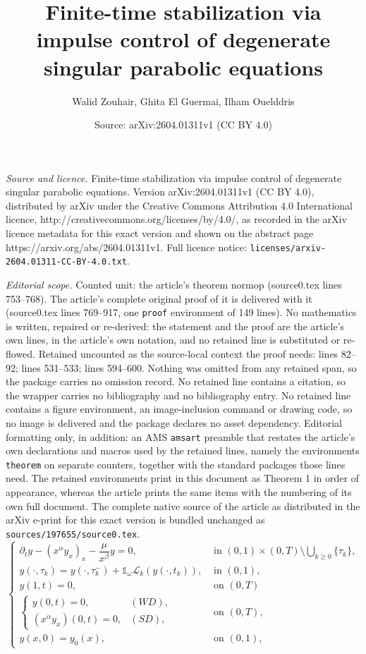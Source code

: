 \documentclass[10pt,a4paper]{amsart}
\title{Finite-time stabilization via impulse control of degenerate singular parabolic equations}
\author{Walid Zouhair, Ghita El Guermai, Ilham Ouelddris}
\date{Source: arXiv:2604.01311v1 (CC BY 4.0)}
\begin{document}
\maketitle

\noindent\emph{Source and licence.} Finite-time stabilization via impulse control of degenerate singular parabolic equations. Version arXiv:2604.01311v1 (CC BY 4.0), distributed by arXiv under the Creative Commons Attribution 4.0 International licence, http://creativecommons.org/licenses/by/4.0/, as recorded in the arXiv licence metadata for this exact version and shown on the abstract page https://arxiv.org/abs/2604.01311v1. Full licence notice: \texttt{licenses/arxiv-2604.01311-CC-BY-4.0.txt}.\par\smallskip

\noindent\textit{Editorial scope.} Counted unit: the article's theorem normop (source0.tex lines 753--768). The article's complete original proof of it is delivered with it (source0.tex lines 769--917, one \texttt{proof} environment of 149 lines). No mathematics is written, repaired or re-derived: the statement and the proof are the article's own lines, in the article's own notation, and no retained line is substituted or re-flowed.  Retained uncounted as the source-local context the proof needs: lines 82--92; lines 531--533; lines 594--600.  Nothing was omitted from any retained span, so the package carries no omission record.  No retained line contains a citation, so the wrapper carries no bibliography and no bibliography entry.  No retained line contains a figure environment, an image-inclusion command or drawing code, so no image is delivered and the package declares no asset dependency.  Editorial formatting only, in addition: an AMS \texttt{amsart} preamble that restates the article's own declarations and macros used by the retained lines, namely the environments \texttt{theorem} on separate counters, together with the standard packages those lines need.  The retained environments print in this document as Theorem 1 in order of appearance, whereas the article prints the same items with the numbering of its own full document.  The complete native source of the article as distributed in the arXiv e-print for this exact version is bundled unchanged as \texttt{sources/197655/source0.tex}.
\begin{equation}\label{1.1}
\begin{cases}\partial_t y-\left(x^\alpha y_x\right)_x-\dfrac{\mu}{x^\beta} y=0, & \text { in }(0,1) \times(0, T) \setminus\displaystyle \bigcup_{k\geq 0 }\{\tau_{k}\}, \\ 
y(\cdot, \tau_{k})=y\left(\cdot, \tau_{k}^{-}\right)+\mathds{1}_{\omega} \mathcal{L}_{k}(y(\cdot,t_{k})), &\text { in } (0,1),\\
y(1, t)=0,  & \text { on }(0, T)\\
\left\{\begin{array}{ll}
y(0, t)=0, & (W D), \\
\left(x^\alpha y_x\right)(0, t)=0, & (S D),
\end{array} \right. &\text { on }(0, T),\\
y(x, 0)=y_0(x), & \text { on }(0,1),
\end{cases}
\end{equation}
\end{document}
